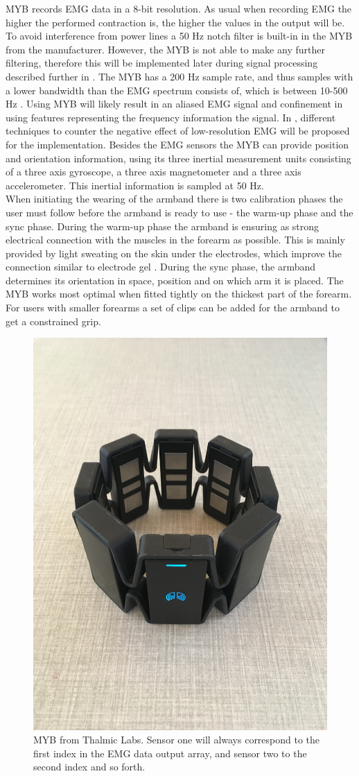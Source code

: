 MYB records EMG data in a 8-bit resolution. As usual when recording EMG the higher the performed contraction is, the higher the values in the output will be. To avoid interference from power lines a 50 Hz notch filter is built-in in the MYB from the manufacturer. However, the MYB is not able to make any further filtering, therefore this will be implemented later during signal processing described further in . The MYB has a 200 Hz sample rate, and thus samples with a lower bandwidth than the EMG spectrum consists of, which is between 10-500 Hz \cite{Cram2012}. Using MYB will likely result in an aliased EMG signal and confinement in using features representing the frequency information the signal. In , different techniques to counter the negative effect of low-resolution EMG will be proposed for the implementation. 
Besides the EMG sensors the MYB can provide position and orientation information, using its three inertial measurement units consisting of a three axis gyroscope, a three axis magnetometer and a three axis accelerometer. This inertial information is sampled at 50 Hz. \cite{Myoarmband2013} \\
When initiating the wearing of the armband there is two calibration phases the user must follow before the armband is ready to use - the warm-up phase and the sync phase. During the warm-up phase the armband is ensuring as strong electrical connection with the muscles in the forearm as possible. This is mainly provided by light sweating on the skin under the electrodes, which improve the connection similar to electrode gel \cite{Cram2012}. During the sync phase, the armband determines its orientation in space, position and on which arm it is placed. The MYB works most optimal when fitted tightly on the thickest part of the forearm. For users with smaller forearms a set of clips can be added for the armband to get a constrained grip. \cite{Myoarmband2013}

\begin{figure}[H]                 
	\includegraphics[width=.4\textwidth]{figures/xBackground/myoband}  
	\caption{MYB from Thalmic Labs. Sensor one will always correspond to the first index in the EMG data output array, and sensor two to the second index and so forth.}
	\label{fig:myoarmband} 
\end{figure}

